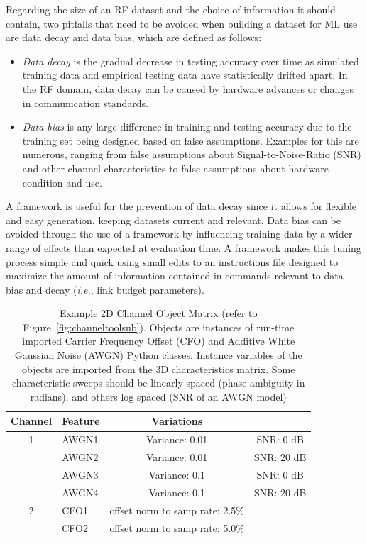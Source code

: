 Regarding the size of an RF dataset and the choice of information it should contain, two pitfalls that need to be avoided when building a dataset for ML use are data decay and data bias, which are defined as follows:
\begin{itemize}
	\item \textit{Data decay} is the gradual decrease in testing accuracy over time as simulated training data and empirical testing data have statistically drifted apart. In the RF domain, data decay can be caused by hardware advances or changes in communication standards.
    \item \textit{Data bias} is any large difference in training and testing accuracy due to the training set being designed based on false assumptions. Examples for this are numerous, ranging from false assumptions about Signal-to-Noise-Ratio (SNR) and other channel characteristics to false assumptions about hardware condition and use.
\end{itemize}    
A framework is useful for the prevention of data decay since it allows for flexible and easy generation, keeping datasets current and relevant. Data bias can be avoided through the use of a framework by influencing training data by a wider range of effects than expected at evaluation time. A framework makes this tuning process simple and quick using small edits to an instructions file designed to maximize the amount of information contained in commands relevant to data bias and decay (\textit{i.e.}, link budget parameters).

\begin{table}[ht!]
\centering
\caption{Example 2D Channel Object Matrix (refer to Figure~\ref{fig:channeltoolsub}). Objects are instances of run-time imported Carrier Frequency Offset (CFO) and Additive White Gaussian Noise (AWGN) Python classes. Instance variables of the objects are imported from the 3D characteristics matrix. Some characteristic sweeps should be linearly spaced (phase ambiguity in radians), and others log spaced (SNR of an AWGN model)} 
\label{fig:channeltoolstructure}
\begin{tabular*}{1\textwidth}{c l c c}
\toprule
Channel & Feature & Variations & \\\hline
1&AWGN1 & Variance: 0.01 & SNR: 0 dB\\
&AWGN2 & Variance: 0.01 & SNR: 20 dB\\
&AWGN3 & Variance: 0.1 & SNR: 0 dB\\
&AWGN4 & Variance: 0.1 & SNR: 20 dB\\\hline
2&CFO1 & offset norm to samp rate: 2.5\% &\\
&CFO2 & offset norm to samp rate: 5.0\% &\\
\bottomrule
\end{tabular*}
\label{table:tab3}
\end{table}

